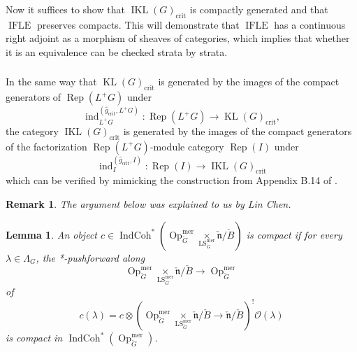 \documentclass[10pt,a4paper]{amsart}
\newtheorem{lem}[subsubsection]{Lemma}
\newtheorem{rem}[subsubsection]{Remark}
\newcommand{\on}[1]{\operatorname{#1}}
\newcommand{\IndCoh}{\on{IndCoh}}
\newcommand{\KL}{\on{KL}(G)_{\on{crit}}}
\newcommand{\IKL}{\on{IKL}(G)_{\on{crit}}}
\newcommand{\Gcheck}{\check{G}}
\newcommand{\ncheck}{\check{\mathfrak{n}}}
\newcommand{\Bcheck}{\check{B}}
\newcommand{\sssec}[1]{\subsubsection{}}
\begin{document}
\sssec{}
Now it suffices to show that $\IKL$ is compactly generated and that $\on{IFLE}$ preserves compacts. This will demonstrate that $\on{IFLE}$ has a continuous right adjoint as a morphism of sheaves of categories, which implies that whether it is an equivalence can be checked strata by strata.

\sssec{}
In the same way that $\KL$ is generated by the images of the compact generators of $\on{Rep}(L^+G)$ under
$$
\on{ind}_{L^+G}^{(\hat{g}_{\on{crit}}, L^+G)} : \on{Rep}(L^+G) \to \KL,
$$
the category $\IKL$ is generated by the images of the compact generators of the factorization $\on{Rep}(L^+G)$-module category $\on{Rep}(I)$ under
$$
\on{ind}_{I}^{(\hat{g}_{\on{crit}}, I)} : \on{Rep}(I) \to \IKL
$$
which can be verified by mimicking the construction from Appendix B.14 of \cite{GLC2}.

\begin{rem}
    The argument below was explained to us by Lin Chen.
\end{rem}
\begin{lem}
    An object $c \in \IndCoh^*(\on{Op}_{\Gcheck}^{\on{mer}} \underset{\on{LS}_{\Gcheck}^{\on{mer}}}{\times} \ncheck/\Bcheck)$ is compact if for every $\lambda \in \Lambda_{G}$, the *-pushforward along
    $$
    \on{Op}_{\Gcheck}^{\on{mer}} \underset{\on{LS}_{\Gcheck}^{\on{mer}}}{\times} \ncheck/\Bcheck \longrightarrow \on{Op}_{\Gcheck}^{\on{mer}}
    $$
    of
    $$
    c(\lambda) = c \otimes (\on{Op}_{\Gcheck}^{\on{mer}} \underset{\on{LS}_{\Gcheck}^{\on{mer}}}{\times} \ncheck/\Bcheck \to \ncheck/\Bcheck)^! \mathcal{O}(\lambda)
    $$
    is compact in $\IndCoh^*(\on{Op}_{\Gcheck}^{\on{mer}})$.
\end{lem}
\end{document}
